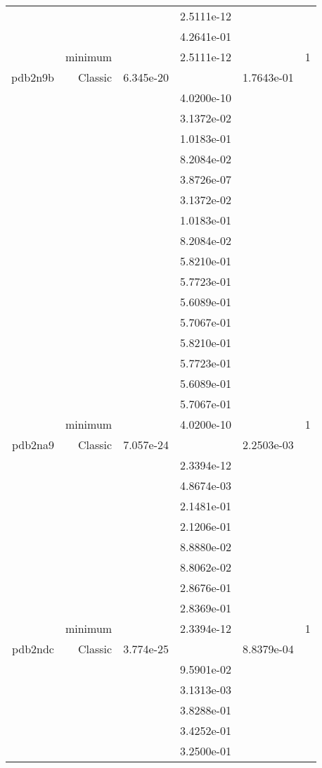 \begin{xltabular}{\textwidth}{r|rS[table-format=1.3e+2]S[table-format=1.4e+2]S[table-format=1.4e+2]S[table-format=-1.5]}
&  &  & 2.5111e-12 & & \\
&  &  & 4.2641e-01 & & \\
& minimum &  & 2.5111e-12 & & 1 \\  \addlinespace
pdb2n9b & Classic & 6.345e-20 &  & 1.7643e-01 & \\
&  &  & 4.0200e-10 & & \\
&  &  & 3.1372e-02 & & \\
&  &  & 1.0183e-01 & & \\
&  &  & 8.2084e-02 & & \\
&  &  & 3.8726e-07 & & \\
&  &  & 3.1372e-02 & & \\
&  &  & 1.0183e-01 & & \\
&  &  & 8.2084e-02 & & \\
&  &  & 5.8210e-01 & & \\
&  &  & 5.7723e-01 & & \\
&  &  & 5.6089e-01 & & \\
&  &  & 5.7067e-01 & & \\
&  &  & 5.8210e-01 & & \\
&  &  & 5.7723e-01 & & \\
&  &  & 5.6089e-01 & & \\
&  &  & 5.7067e-01 & & \\
& minimum &  & 4.0200e-10 & & 1 \\  \addlinespace
pdb2na9 & Classic & 7.057e-24 &  & 2.2503e-03 & \\
&  &  & 2.3394e-12 & & \\
&  &  & 4.8674e-03 & & \\
&  &  & 2.1481e-01 & & \\
&  &  & 2.1206e-01 & & \\
&  &  & 8.8880e-02 & & \\
&  &  & 8.8062e-02 & & \\
&  &  & 2.8676e-01 & & \\
&  &  & 2.8369e-01 & & \\
& minimum &  & 2.3394e-12 & & 1 \\  \addlinespace
pdb2ndc & Classic & 3.774e-25 &  & 8.8379e-04 & \\
&  &  & 9.5901e-02 & & \\
&  &  & 3.1313e-03 & & \\
&  &  & 3.8288e-01 & & \\
&  &  & 3.4252e-01 & & \\
&  &  & 3.2500e-01 & & \\

\end{xltabular}
